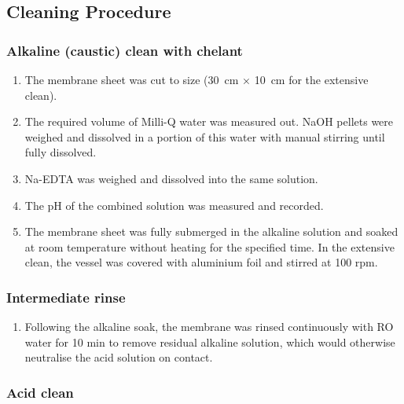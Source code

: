 \subsection{Cleaning Procedure}
\label{sec:cleaning-procedure}
\subsubsection*{Alkaline (caustic) clean with chelant}

\begin{enumerate}

\item The membrane sheet was cut to size (\qty{30}{\centi\metre} × \qty{10}{\centi\metre} for the extensive clean).

\item The required volume of Milli-Q water was measured out. NaOH pellets were weighed and dissolved in a portion of this water with manual stirring until fully dissolved.

\item Na-EDTA was weighed and dissolved into the same solution.

\item The pH of the combined solution was measured and recorded.

\item The membrane sheet was fully submerged in the alkaline solution and soaked at room temperature without heating for the specified time. In the extensive clean, the vessel was covered with aluminium foil and stirred at 100 rpm.

\end{enumerate}

\subsubsection*{Intermediate rinse}

\begin{enumerate}[resume]

\item Following the alkaline soak, the membrane was rinsed continuously with RO water for 10 min to remove residual alkaline solution, which would otherwise neutralise the acid solution on contact.

\end{enumerate}

\subsubsection*{Acid clean}

